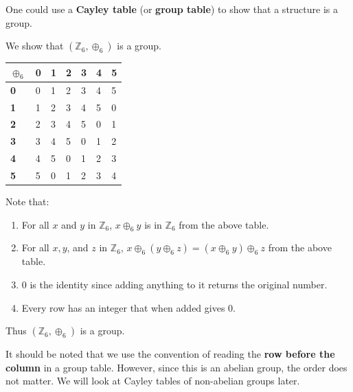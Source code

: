 One could use a \textbf{Cayley table} (or \textbf{group table}) to show that a structure is a group.
\begin{example}
    We show that $(\mathbb{Z}_6, \oplus_6)$ is a group.
    \begin{table}[h]
        \centering
        \begin{tabular}{|l|l|l|l|l|l|l|}
        \hline
        \textbf{$\oplus_6$} & \textbf{0} & \textbf{1} & \textbf{2} & \textbf{3} & \textbf{4} & \textbf{5} \\ \hline
        \textbf{0}          & 0          & 1          & 2          & 3          & 4          & 5          \\ \hline
        \textbf{1}          & 1          & 2          & 3          & 4          & 5          & 0          \\ \hline
        \textbf{2}          & 2          & 3          & 4          & 5          & 0          & 1          \\ \hline
        \textbf{3}          & 3          & 4          & 5          & 0          & 1          & 2          \\ \hline
        \textbf{4}          & 4          & 5          & 0          & 1          & 2          & 3          \\ \hline
        \textbf{5}          & 5          & 0          & 1          & 2          & 3          & 4          \\ \hline
        \end{tabular}
    \end{table}
    Note that:
    \begin{enumerate}
        \item For all $x$ and $y$ in $\mathbb{Z}_6$, $x \oplus_6 y$ is in $\mathbb{Z}_6$ from the above table.
        \item For all $x, y$, and $z$ in $\mathbb{Z}_6$, $x \oplus_6 (y \oplus_6 z) = (x \oplus_6 y) \oplus_6 z$ from the above table.
        \item 0 is the identity since adding anything to it returns the original number.
        \item Every row has an integer that when added gives 0.
    \end{enumerate}
    Thus $(\mathbb{Z}_6, \oplus_6)$ is a group.
\end{example}

It should be noted that we use the convention of reading the \textbf{row before the column} in a group table. However, since this is an abelian group, the order does not matter. We will look at Cayley tables of non-abelian groups later.

